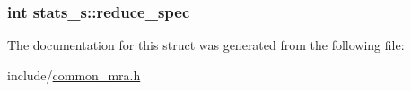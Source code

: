 \hypertarget{structstats__s_a72a455323e2db452773d6e4d21fe8554}{
\subsubsection[{reduce\-\_\-spec}]{\setlength{\rightskip}{0pt plus 5cm}int {\bf stats\-\_\-s\-::reduce\-\_\-spec}}}\label{structstats__s_a72a455323e2db452773d6e4d21fe8554}


\-The documentation for this struct was generated from the following file\-:\begin{DoxyCompactItemize}
\item 
include/\hyperlink{common__mra_8h}{common\-\_\-mra.\-h}\end{DoxyCompactItemize}
